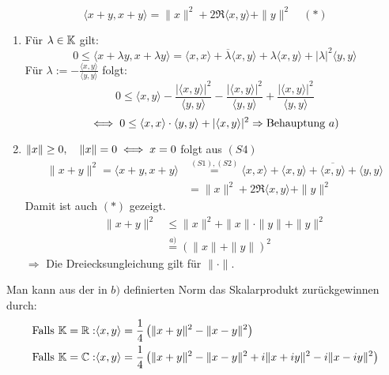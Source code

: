\begin{bemerkung*}
	\[ \langle x + y, x + y \rangle = \| x\|^{2} + 2 \Re \langle x, y \rangle + \| y \|^{2} \quad (*) \label{eq:15.2-*} \]
\end{bemerkung*}

\begin{beweis} %
	\begin{enumerate}[label=\alph*\upshape)]
		\item Für $\lambda \in \mathbb{K}$ gilt:
			\[ 0 \leq \langle x + \lambda y, x + \lambda y \rangle = \langle x, x \rangle + \overline{\lambda} \langle x, y \rangle + \lambda \langle x, y \rangle + |\lambda|^{2} \langle y, y \rangle \]
			Für $\lambda := - \frac{\langle x, y \rangle}{\langle y, y \rangle}$ folgt:
			\[ 0 \leq \langle x, y \rangle - \frac{|\langle x,y \rangle|^{2}}{\langle y, y \rangle} - \frac{|\langle x, y \rangle|^{2}}{\langle y, y \rangle} + \frac{|\langle x, y \rangle|^{2}}{\langle y, y \rangle} \]
			\[ \iff 0 \leq \langle x, x \rangle \cdot \langle y, y \rangle + |\langle x, y \rangle|^{2} \Rightarrow \text{Behauptung } a) \]
		\item $\| x \| \geq 0, \quad \| x \| = 0 \iff x = 0$ folgt aus \hyperref[def:15.1iv]{$(S4)$} \\
			\begin{align*}
				\| x + y \|^{2} = \langle x + y, x + y \rangle & \overset{\hyperref[def:15.1-Skalarprodukt]{(S1), (S2)}}{=} \langle x, x \rangle + \langle x, y \rangle + \overline{\langle x, y \rangle} + \langle y, y \rangle \\
						& = \| x \|^{2} + 2 \Re \langle x, y \rangle + \| y \|^{2}
			\end{align*}
			Damit ist auch \hyperref[eq:15.2-*]{$(*)$} gezeigt.
			\begin{align*}
				\| x + y \|^{2} & \leq \| x \|^{2} + \| x \| \cdot \| y \| + \| y \|^{2} \\
						& \overset{\hyperref[prop:15.2a]{a)}}{=} \left( \| x \| + \| y \| \right)^{2}
			\end{align*}
			$\Rightarrow$ Die Dreiecksungleichung gilt für $\| \cdot \|$.
	\end{enumerate}	
\end{beweis}


\begin{bemerkung} \label{bem:15.3}
	Man kann aus der in \hyperref[prop:15.2b]{$b)$} definierten Norm das Skalarprodukt zurückgewinnen durch:
	\begin{align*}
		\text{Falls } \mathbb{K} = \mathbb{R}: &  \langle x, y \rangle = \frac{1}{4} \left( \| x + y \|^{2} - \| x - y \|^{2} \right) \\
		\text{Falls } \mathbb{K} = \mathbb{C}: &  \langle x, y \rangle = \frac{1}{4} \left( \| x + y \|^{2} - \| x - y \|^{2} + i \| x + i y\|^{2} - i \| x - iy\|^{2} \right)
	\end{align*}
\end{bemerkung}


